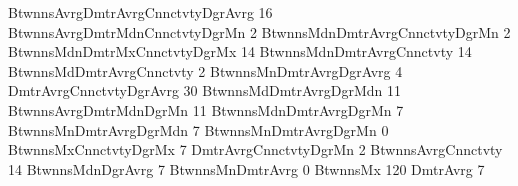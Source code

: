 BtwnnsAvrgDmtrAvrgCnnctvtyDgrAvrg
16
BtwnnsAvrgDmtrMdnCnnctvtyDgrMn
2
BtwnnsMdnDmtrAvrgCnnctvtyDgrMn
2
BtwnnsMdnDmtrMxCnnctvtyDgrMx
14
BtwnnsMdnDmtrAvrgCnnctvty
14
BtwnnsMdDmtrAvrgCnnctvty
2
BtwnnsMnDmtrAvrgDgrAvrg
4
DmtrAvrgCnnctvtyDgrAvrg
30
BtwnnsMdDmtrAvrgDgrMdn
11
BtwnnsAvrgDmtrMdnDgrMn
11
BtwnnsMdnDmtrAvrgDgrMn
7
BtwnnsMnDmtrAvrgDgrMdn
7
BtwnnsMnDmtrAvrgDgrMn
0
BtwnnsMxCnnctvtyDgrMx
7
DmtrAvrgCnnctvtyDgrMn
2
BtwnnsAvrgCnnctvty
14
BtwnnsMdnDgrAvrg
7
BtwnnsMnDmtrAvrg
0
BtwnnsMx
120
DmtrAvrg
7
